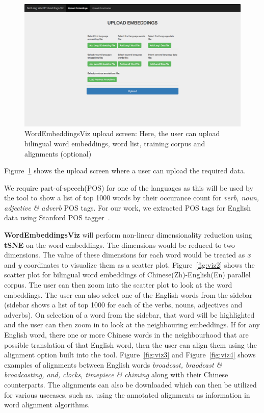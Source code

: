 \begin{figure}[htbp]
	\begin{center}
		\includegraphics[width=\textwidth]{files/images/viz1}
	\end{center}
	\caption{WordEmbeddingsViz upload screen: Here, the user can upload bilingual word embeddings, word list, training corpus and alignments (optional)}
	\label{fig:viz1}
\end{figure}

Figure~\ref{fig:viz1} shows the upload screen where a user can upload the required data.

We require part-of-speech(POS) for one of the languages as this will be used by the tool to show a list of top 1000 words by their occurance count for \textit{verb, noun, adjective \& adverb} POS tags. For our work, we extracted POS tags for English data using Stanford POS tagger~\cite{POS}.

\textbf{WordEmbeddingsViz} will perform non-linear dimensionality reduction using \textbf{tSNE} on the word embeddings. The dimensions would be reduced to two dimensions. The value of these dimensions for each word would be treated as \textit{x} and \textit{y} coordinates to visualize them as a scatter plot. Figure~\ref{fig:viz2} shows the scatter plot for bilingual word embeddings of Chinese(Zh)-English(En) parallel corpus. The user can then zoom into the scatter plot to look at the word embeddings. The user can also select one of the English words from the sidebar (sidebar shows a list of top 1000 for each of the verbs, nouns, adjectives and adverbs). On selection of a word from the sidebar, that word will be highlighted and the user can then zoom in to look at the neighbouring embeddings. If for any English word, there one or more Chinese words in the neighbourhood that are possible translation of that English word, then the user can align them using the alignment option built into the tool. Figure~\ref{fig:viz3} and Figure~\ref{fig:viz4} shows examples of alignments between English words \textit{broadcast, braodcast \& broadcasting, and, clocks, timepiece \& chiming} along with their Chinese counterparts. The alignments can also be downloaded which can then be utilized for various usecases, such as, using the annotated alignments as information in word alignment algorithms.

